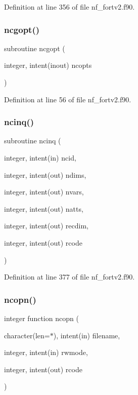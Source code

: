 Definition at line 356 of file nf\+\_\+fortv2.\+f90.

\mbox{\label{nf__fortv2_8f90_a4fe1ac0350a63230cc17e880d496efa3}} 
\subsubsection{\texorpdfstring{ncgopt()}{ncgopt()}}
{\footnotesize\ttfamily subroutine ncgopt (\begin{DoxyParamCaption}\item[{integer, intent(inout)}]{ncopts }\end{DoxyParamCaption})}



Definition at line 56 of file nf\+\_\+fortv2.\+f90.

\mbox{\label{nf__fortv2_8f90_aeb39546c2eeb1bc23ac957a2388fc56b}} 
\subsubsection{\texorpdfstring{ncinq()}{ncinq()}}
{\footnotesize\ttfamily subroutine ncinq (\begin{DoxyParamCaption}\item[{integer, intent(in)}]{ncid,  }\item[{integer, intent(out)}]{ndims,  }\item[{integer, intent(out)}]{nvars,  }\item[{integer, intent(out)}]{natts,  }\item[{integer, intent(out)}]{recdim,  }\item[{integer, intent(out)}]{rcode }\end{DoxyParamCaption})}



Definition at line 377 of file nf\+\_\+fortv2.\+f90.

\mbox{\label{nf__fortv2_8f90_a43dce57f3c98cba43a7394b48ecd3184}} 
\subsubsection{\texorpdfstring{ncopn()}{ncopn()}}
{\footnotesize\ttfamily integer function ncopn (\begin{DoxyParamCaption}\item[{character(len=$\ast$), intent(in)}]{filename,  }\item[{integer, intent(in)}]{rwmode,  }\item[{integer, intent(out)}]{rcode }\end{DoxyParamCaption})}



